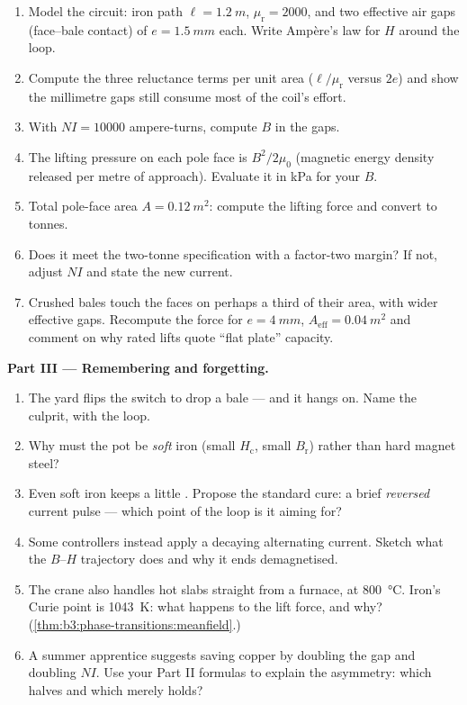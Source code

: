 \begin{problem}
\begin{enumerate}[resume]
  \item Model the circuit: iron path $\ell = \qty{1.2}{m}$,
        $\mu_{\text{r}} = 2000$, and two effective air gaps
        (face--bale contact) of $e = \qty{1.5}{mm}$ each. Write
        Ampère's law for $H$ around the loop.
  \item Compute the three reluctance terms per unit area
        ($\ell/\mu_{\text{r}}$ versus $2e$) and show the
        millimetre gaps still consume most of the coil's effort.
  \item With $NI = \num{10000}$ ampere-turns, compute $B$ in the
        gaps.
  \item The lifting pressure on each pole face is $B^2/2\mu_0$
        (magnetic energy density released per metre of approach).
        Evaluate it in \unit{kPa} for your $B$.
  \item Total pole-face area $A = \qty{0.12}{m^2}$: compute the
        lifting force and convert to tonnes.
  \item Does it meet the two-tonne specification with a factor-two
        margin? If not, adjust $NI$ and state the new current.
  \item Crushed bales touch the faces on perhaps a third of their
        area, with wider effective gaps. Recompute the force for
        $e = \qty{4}{mm}$, $A_{\text{eff}} = \qty{0.04}{m^2}$ and
        comment on why rated lifts quote ``flat plate'' capacity.
\end{enumerate}

\medskip\noindent\textbf{Part III --- Remembering and forgetting.}

\begin{enumerate}[resume]
  \item The yard flips the switch to drop a bale --- and it hangs
        on. Name the culprit, with the  loop.
  \item Why must the pot be \emph{soft} iron (small
        $H_{\text{c}}$, small $B_{\text{r}}$) rather than hard
        magnet steel?
  \item Even soft iron keeps a little . Propose the
        standard cure: a brief \emph{reversed} current pulse ---
        which point of the loop is it aiming for?
  \item Some controllers instead apply a decaying alternating
        current. Sketch what the $B$--$H$ trajectory does and why
        it ends demagnetised.
  \item The crane also handles hot slabs straight from a furnace,
        at \qty{800}{\celsius}. Iron's Curie point is
        \qty{1043}{K}: what happens to the lift force, and why?
        (\cref{thm:b3:phase-transitions:meanfield}.)
  \item A summer apprentice suggests saving copper by doubling
        the gap and doubling $NI$. Use your Part II formulas to
        explain the asymmetry: which halves and which merely
        holds?
\end{enumerate}


\end{problem}
